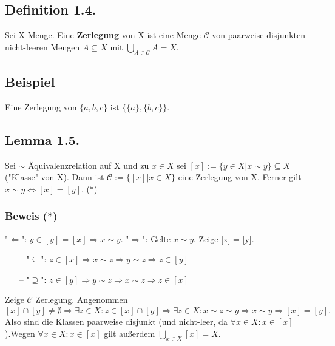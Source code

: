\documentclass[a4paper, 12pt]{extarticle}
\begin{document}
\subsection*{Definition 1.4.}
Sei X Menge. Eine \textbf{Zerlegung} von X ist eine Menge $\mathcal{C}$ von paarweise disjunkten nicht-leeren Mengen $A \subseteq X$ mit $\bigcup_{A \in \mathcal{C}} A = X$.

\subsection*{Beispiel}
Eine Zerlegung von $\{ a, b, c\}$ ist $\{\{ a\}, \{ b, c\}\}$.

\subsection*{Lemma 1.5.}
Sei $\sim$ Äquivalenzrelation auf X und zu $x \in X$ sei $[x] := \{y \in X | x \sim y\} \subseteq X$ ("Klasse" von X).\newline
Dann ist $\mathcal{C} := \{[x] | x \in X\}$ eine Zerlegung von X.\newline
Ferner gilt $x \sim y \Leftrightarrow [x] =  [y]$. (*)\newline
\subsubsection*{Beweis (*)}
"$\Leftarrow$": $y \in [y] = [x] \Rightarrow x \sim y$.\newline
"$\Rightarrow$": Gelte $x \sim y$. Zeige [x] = [y].
\begin{itemize}
\item[--] "$\subseteq$": $z \in [x] \Rightarrow x \sim z \Rightarrow y \sim z \Rightarrow z \in [y]$
\item[--] "$\supseteq$": $z \in [y] \Rightarrow y \sim z \Rightarrow x \sim z \Rightarrow z \in [x]$\newline
\end{itemize}
Zeige $\mathcal{C}$ Zerlegung.\newline
Angenommen $[x] \cap [y] \neq \emptyset \Rightarrow \exists z \in X: z \in [x] \cap [y] \Rightarrow \exists z \in X: x \sim z \sim y \Rightarrow x \sim y \Rightarrow [x] = [y].$\newline Also sind die Klassen paarweise disjunkt (und nicht-leer, da $\forall x \in X: x \in [x]$).\newline Wegen $\forall x \in X: x \in [x]$ gilt außerdem $\bigcup_{x \in X} [x] = X$.
\end{document}
